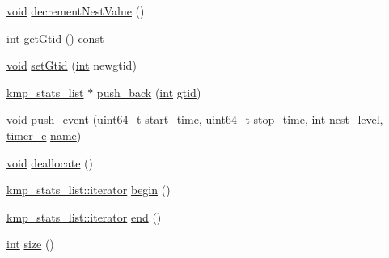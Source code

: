 \begin{DoxyCompactItemize}
\item 
\hyperlink{ittnotify__static_8h_af941d56e55e3c5465135b60c4d6343ed}{void} \hyperlink{classkmp__stats__list_a9a27398f0f242283d1f9c8afa1b32bab}{decrement\-Nest\-Value} ()
\item 
\hyperlink{ittnotify__static_8h_a8b8dcd723308a8cb5d84277c7a3fff70}{int} \hyperlink{classkmp__stats__list_a44060b0c7135d18a7da2941a380ccfd1}{get\-Gtid} () const 
\item 
\hyperlink{ittnotify__static_8h_af941d56e55e3c5465135b60c4d6343ed}{void} \hyperlink{classkmp__stats__list_a5e3e9a151fa2bf3bc1346ef3786bcdd1}{set\-Gtid} (\hyperlink{ittnotify__static_8h_a8b8dcd723308a8cb5d84277c7a3fff70}{int} newgtid)
\item 
\hyperlink{classkmp__stats__list}{kmp\-\_\-stats\-\_\-list} $\ast$ \hyperlink{classkmp__stats__list_a5c9c2bae3aee4483d1a1a6119752687e}{push\-\_\-back} (\hyperlink{ittnotify__static_8h_a8b8dcd723308a8cb5d84277c7a3fff70}{int} \hyperlink{classkmp__stats__list_a18c3971024dbebaaeb981747c0bfa34a}{gtid})
\item 
\hyperlink{ittnotify__static_8h_af941d56e55e3c5465135b60c4d6343ed}{void} \hyperlink{classkmp__stats__list_aa342e93ee4681eae6f8ab145ead4c31f}{push\-\_\-event} (uint64\-\_\-t start\-\_\-time, uint64\-\_\-t stop\-\_\-time, \hyperlink{ittnotify__static_8h_a8b8dcd723308a8cb5d84277c7a3fff70}{int} nest\-\_\-level, \hyperlink{kmp__stats_8h_ae03f1e0ff609f86afa9b7167a12c6c06}{timer\-\_\-e} \hyperlink{ittnotify__static_8h_a1c34b35a4952969fef60192313bba34a}{name})
\item 
\hyperlink{ittnotify__static_8h_af941d56e55e3c5465135b60c4d6343ed}{void} \hyperlink{classkmp__stats__list_a0e847043a942149b86455a21d30d3719}{deallocate} ()
\item 
\hyperlink{classkmp__stats__list_1_1iterator}{kmp\-\_\-stats\-\_\-list\-::iterator} \hyperlink{classkmp__stats__list_af688afb91e7dab63d4b1005d8c2d858e}{begin} ()
\item 
\hyperlink{classkmp__stats__list_1_1iterator}{kmp\-\_\-stats\-\_\-list\-::iterator} \hyperlink{classkmp__stats__list_ad0ae8a080fec141c81d3e3454d25c99b}{end} ()
\item 
\hyperlink{ittnotify__static_8h_a8b8dcd723308a8cb5d84277c7a3fff70}{int} \hyperlink{classkmp__stats__list_a2e7b8c47d79298daa179a368132af8af}{size} ()
\end{DoxyCompactItemize}
